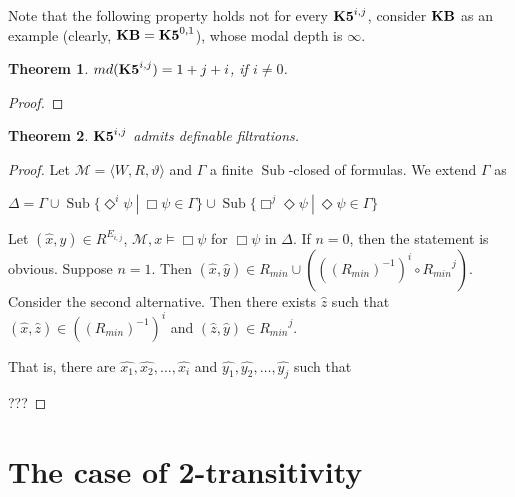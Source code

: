 \documentclass[a4paper]{article}
\theoremstyle{defin}
\theoremstyle{theorem}
\newtheorem{theorem}{Theorem}
\theoremstyle{prop}
\theoremstyle{lemma}
\theoremstyle{fact}
\theoremstyle{ex}
\theoremstyle{col}
\theoremstyle{claim}
\begin{document}
Note that the following property holds not for every ${\bf K5}^{i,j}$, consider ${\bf KB}$ as an example (clearly, ${\bf KB} = {\bf K5}^{0,1}$), whose modal depth is $\infty$.

\begin{theorem}
$md({\bf K5}^{i,j}) = 1 + j + i$, if $i \neq 0$.
\end{theorem}

\begin{proof}

\end{proof}

\begin{theorem}
  ${\bf K5}^{i,j}$ admits definable filtrations.
\end{theorem}

\begin{proof}
  Let $\mathcal{M} = \langle W, R, \vartheta \rangle$ and $\Gamma$ a finite $\operatorname{Sub}$-closed of formulas. We extend $\Gamma$ as
  \begin{center}
    $\Delta = \Gamma \cup \operatorname{Sub}\{  \Diamond^{i} \psi \: | \: \Box \psi \in \Gamma \} \cup \operatorname{Sub}\{ \Box^{j} \Diamond \psi \: | \: \Diamond \psi \in \Gamma \}$
  \end{center}
  Let $(\hat{x}, \hat{y}) \in R^{E_{i,j}}$, $\mathcal{M}, x \models \Box \psi$ for $\Box \psi$ in $\Delta$.
  If $n = 0$, then the statement is obvious. Suppose $n = 1$.
  Then $(\hat{x}, \hat{y}) \in R_{min} \cup (((R_{min})^{-1})^i \circ {R_{min}}^j)$. Consider the second alternative. Then there exists $\hat{z}$ such that $(\hat{x}, \hat{z}) \in ((R_{min})^{-1})^i $ and $(\hat{z}, \hat{y}) \in {R_{min}}^j$.

  That is, there are $\hat{x_1}, \hat{x_2}, \dots, \hat{x_i}$ and $\hat{y_1}, \hat{y_2}, \dots, \hat{y_j}$ such that


  ???
\end{proof}

\section{The case of 2-transitivity}
\end{document}
